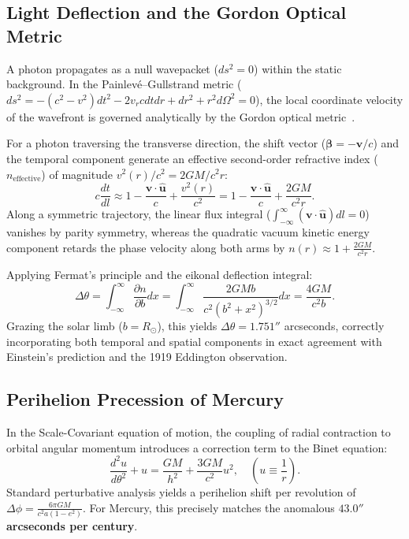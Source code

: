 \documentclass[11pt,a4paper]{article}
\begin{document}
\subsection{Light Deflection and the Gordon Optical Metric}
A photon propagates as a null wavepacket ($ds^2 = 0$) within the static background. In the Painlev\'e--Gullstrand metric ($ds^2 = -(c^2 - v^2) dt^2 - 2v_r c dt dr + dr^2 + r^2 d\Omega^2 = 0$), the local coordinate velocity of the wavefront is governed analytically by the Gordon optical metric~\cite{hamilton2008}.

For a photon traversing the transverse direction, the shift vector ($\boldsymbol{\beta} = -\mathbf{v}/c$) and the temporal component generate an effective second-order refractive index ($n_{\mathrm{effective}}$) of magnitude $v^2(r)/c^2 = 2GM/c^2 r$:
\begin{equation}
    c \frac{dt}{dl} \approx 1 - \frac{\mathbf{v} \cdot \hat{\mathbf{u}}}{c} + \frac{v^2(r)}{c^2} = 1 - \frac{\mathbf{v} \cdot \hat{\mathbf{u}}}{c} + \frac{2GM}{c^2 r}.
    \label{eq:kirilma_indisi_pg}
\end{equation}
Along a symmetric trajectory, the linear flux integral ($\int_{-\infty}^{\infty} (\mathbf{v} \cdot \hat{\mathbf{u}}) dl = 0$) vanishes by parity symmetry, whereas the quadratic vacuum kinetic energy component retards the phase velocity along both arms by $n(r) \approx 1 + \frac{2GM}{c^2 r}$.

Applying Fermat's principle and the eikonal deflection integral:
\begin{equation}
    \Delta \theta = \int_{-\infty}^{\infty} \frac{\partial n}{\partial b} dx = \int_{-\infty}^{\infty} \frac{2GM b}{c^2 (b^2 + x^2)^{3/2}} dx = \frac{4GM}{c^2 b}.
    \label{eq:sapma_ispat}
\end{equation}
Grazing the solar limb ($b = R_\odot$), this yields $\Delta \theta = 1.751''$ arcseconds, correctly incorporating both temporal and spatial components in exact agreement with Einstein's prediction and the 1919 Eddington observation.

\subsection{Perihelion Precession of Mercury}
In the Scale-Covariant equation of motion, the coupling of radial contraction to orbital angular momentum introduces a correction term to the Binet equation:
\begin{equation}
    \frac{d^2 u}{d\theta^2} + u = \frac{GM}{h^2} + \frac{3GM}{c^2} u^2, \quad \left(u \equiv \frac{1}{r}\right).
    \label{eq:binet}
\end{equation}
Standard perturbative analysis yields a perihelion shift per revolution of $\Delta \phi = \frac{6\pi GM}{c^2 a (1-e^2)}$. For Mercury, this precisely matches the anomalous \textbf{$43.0''$ arcseconds per century}.
\end{document}
